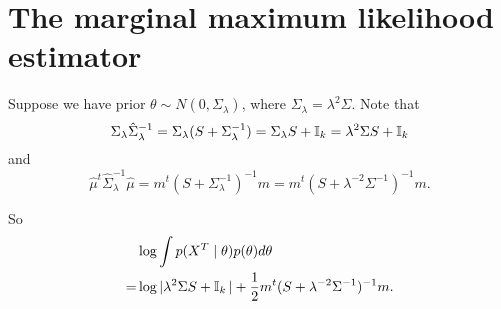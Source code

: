 \documentclass[12pt]{article}
\begin{document}
\section{The marginal maximum likelihood estimator}

Suppose we have prior \(\theta\sim N(0,\Sigma_\lambda)\), where \(\Sigma_\lambda=\lambda^2\Sigma \). Note that 
  \[
\Sigma_\lambda \hat \Sigma_\lambda ^{-1} = \Sigma_\lambda (S+\Sigma_\lambda ^{-1})= \Sigma_\lambda  S + \operatorname{\mathbb{I}}_k=\lambda^2\Sigma  S + \operatorname{\mathbb{I}}_k
\]
and\[
\hat \mu^t \hat\Sigma_\lambda^{-1} \hat\mu = m^t (S+\Sigma_\lambda^{-1})^{-1}m= m^t (S+\lambda^{-2}\Sigma^{-1})^{-1}m. 
\]

So 
\begin{align*}
&\log \int  p(X^T\mid\theta)p(\theta)d\theta \\
= & \log|\lambda^2 \Sigma S + \operatorname{\mathbb{I}}_k| + \frac12 m^t (S+\lambda^{-2}\Sigma^{-1})^{-1}m. 
\end{align*}
\end{document}
